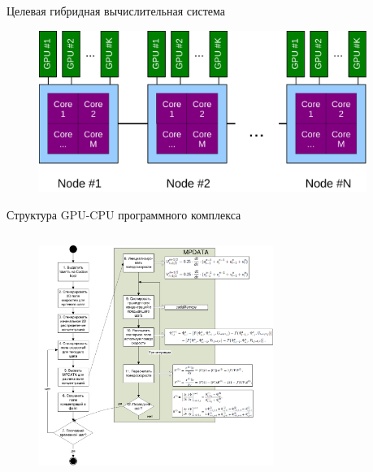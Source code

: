 \begin{frame}{Целевая гибридная вычислительная система}

\begin{figure}
\centering
\includegraphics[width=4.2in]{artwork/pdf/hybrid_scheme}
\end{figure}

\end{frame}



\begin{frame}{Структура GPU-CPU программного комплекса\cite{maemarcus:diploma}}

\begin{figure}
\centering
\includegraphics[height=3.1in, width=3in]{artwork/pdf/code}
\label{fig:wrf-equations}
\end{figure}

\end{frame}



